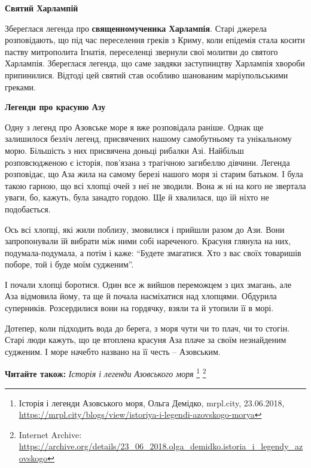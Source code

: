 \begin{center}
\textbf{Святий Харлампій}
\end{center}


Збереглася легенда про \textbf{священномученика Харлампія}. Старі джерела розповідають,
що під час переселення греків з Криму, коли епідемія стала косити паству
митрополита Ігнатія, переселенці звернули свої молитви до святого Харлампія.
Збереглася легенда, що саме завдяки заступництву Харлампія хвороби припинилися.
Відтоді цей святий став особливо шанованим маріупольськими греками.

\begin{center}
\textbf{Легенди про красуню Азу}
\end{center}

Одну з легенд про Азовське море я вже розповідала раніше. Однак ще залишилося
безліч легенд, присвячених нашому самобутньому та унікальному морю. Більшість з
них присвячена доньці рибалки Азі. Найбільш розповсюдженою є історія, пов'язана
з трагічною загибеллю дівчини. Легенда розповідає, що Аза жила на самому березі
нашого моря зі старим батьком. І була такою гарною, що всі хлопці очей з неї не
зводили. Вона ж ні на кого не звертала уваги, бо, кажуть, була занадто гордою.
Ще й хвалилася, що їй ніхто не подобається.


Ось всі хлопці, які жили поблизу, змовилися і прийшли разом до Ази. Вони
запропонували їй вибрати між ними собі нареченого. Красуня глянула на них,
подумала-подумала, а потім і каже: \enquote{Будете змагатися. Хто з вас своїх товаришів
поборе, той і буде моїм судженим}.


І почали хлопці боротися. Один все ж вийшов переможцем з цих змагань, але Аза
відмовила йому, та ще й почала насміхатися над хлопцями. Обдурила суперників.
Розсердилися вони на гордячку, взяли та й утопили її в морі.

Дотепер, коли підходить вода до берега, з моря чути чи то плач, чи то стогін.
Старі люди кажуть, що це втоплена красуня Аза плаче за своїм незнайденим
судженим. І море начебто названо на її честь – Азовським.

\textbf{Читайте також:} \emph{Історія і легенди Азовського моря}%
\footnote{Історія і легенди Азовського моря, Ольга Демідко, mrpl.city, 23.06.2018, \url{https://mrpl.city/blogs/view/istoriya-i-legendi-azovskogo-morya}} %
\footnote{Internet Archive: \url{https://archive.org/details/23_06_2018.olga_demidko.istoria_i_legendy_azovskogo}}

